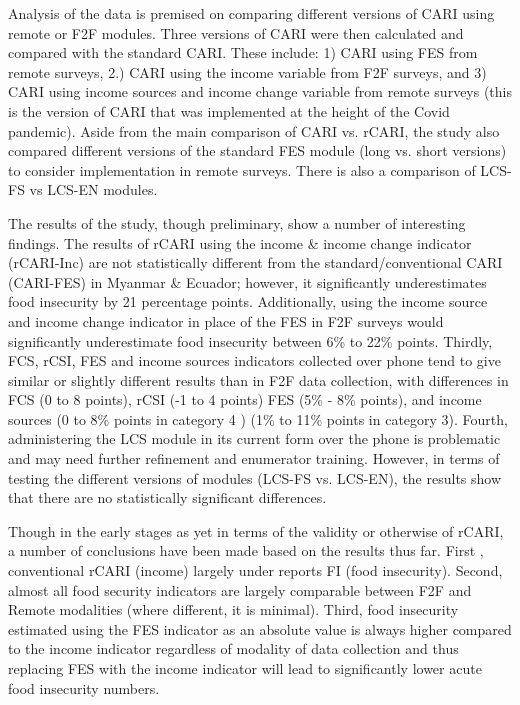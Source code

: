 \documentclass[11pt,harvard]{article}
\begin{document}
Analysis of the data is premised on comparing different versions of CARI using remote or F2F modules. Three versions of CARI were then calculated and compared with the standard CARI. These include: 1) CARI using FES from remote surveys, 2.) CARI using the income variable from F2F surveys, and 3) CARI using income sources and income change variable from remote surveys (this is the version of CARI that was implemented at the height of the Covid pandemic).  Aside from the main comparison of CARI vs. rCARI, the study also compared different versions of the standard FES module (long vs. short versions) to consider implementation in remote surveys. There is also a comparison of LCS-FS vs LCS-EN modules.

The results of the study, though preliminary, show a number of interesting findings. The results of rCARI using the income \& income change indicator (rCARI-Inc) are not statistically different from the standard/conventional CARI (CARI-FES) in Myanmar \& Ecuador; however, it significantly underestimates food insecurity by 21 percentage points. Additionally, using the income source and income change indicator in place of the FES in F2F surveys would significantly underestimate food insecurity between 6\% to 22\% points. Thirdly, FCS, rCSI, FES and income sources indicators collected over phone tend to give similar or slightly different results than in F2F data collection, with differences in FCS (0 to 8 points), rCSI (-1 to 4 points) FES (5\% - 8\% points), and income sources (0 to 8\% points in category 4 ) (1\% to 11\% points in category 3). Fourth, administering the LCS module in its current form over the phone is problematic and may need further refinement and enumerator training. However, in terms of testing the different versions of modules (LCS-FS vs. LCS-EN), the results show that there are no statistically significant differences.
 
Though in the early stages as yet in terms of the validity or otherwise of rCARI, a number of conclusions have been made based on the results thus far. First , conventional rCARI (income) largely under reports FI (food insecurity).  Second, almost all food security indicators are largely comparable between F2F and Remote modalities (where different, it is minimal). Third, food insecurity estimated using the FES indicator as an absolute value is always higher compared to the income indicator regardless of modality of data collection and thus replacing FES with the income indicator will lead to significantly lower acute food insecurity numbers. 
\end{document}
